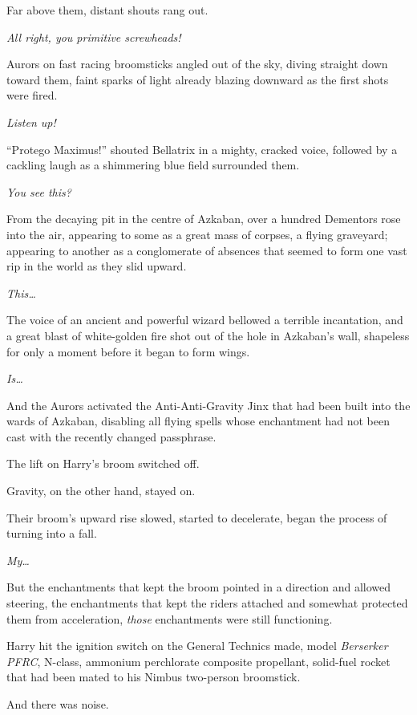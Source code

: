 Far above them, distant shouts rang out.

\emph{All right, you primitive screwheads!}

Aurors on fast racing broomsticks angled out of the sky, diving straight down toward them, faint sparks of light already blazing downward as the first shots were fired.

\emph{Listen up!}

“Protego Maximus!” shouted Bellatrix in a mighty, cracked voice, followed by a cackling laugh as a shimmering blue field surrounded them.

\emph{You see this?}

From the decaying pit in the centre of Azkaban, over a hundred Dementors rose into the air, appearing to some as a great mass of corpses, a flying graveyard; appearing to another as a conglomerate of absences that seemed to form one vast rip in the world as they slid upward.

\emph{This…}

The voice of an ancient and powerful wizard bellowed a terrible incantation, and a great blast of white-golden fire shot out of the hole in Azkaban’s wall, shapeless for only a moment before it began to form wings.

\emph{Is…}

And the Aurors activated the Anti-Anti-Gravity Jinx that had been built into the wards of Azkaban, disabling all flying spells whose enchantment had not been cast with the recently changed passphrase.

The lift on Harry’s broom switched off.

Gravity, on the other hand, stayed on.

Their broom’s upward rise slowed, started to decelerate, began the process of turning into a fall.

\emph{My…}

But the enchantments that kept the broom pointed in a direction and allowed steering, the enchantments that kept the riders attached and somewhat protected them from acceleration, \emph{those} enchantments were still functioning.

\emph{}

Harry hit the ignition switch on the General Technics made, model \emph{Berserker PFRC}, N-class, ammonium perchlorate composite propellant, solid-fuel rocket that had been mated to his Nimbus  two-person broomstick.

And there was noise.

